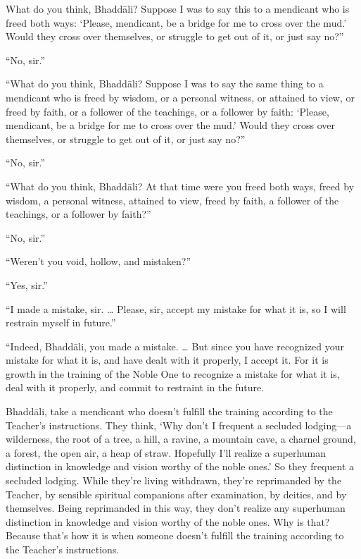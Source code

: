 \documentclass[12pt,openany]{book}%
\begin{document}
What do you think, \textsanskrit{Bhaddāli}? Suppose I was to say this to a mendicant who is freed both ways: ‘Please, mendicant, be a bridge for me to cross over the mud.’ Would they cross over themselves, or struggle to get out of it, or just say no?” 

“No, sir.” 

“What do you think, \textsanskrit{Bhaddāli}? Suppose I was to say the same thing to a mendicant who is freed by wisdom, or a personal witness, or attained to view, or freed by faith, or a follower of the teachings, or a follower by faith: ‘Please, mendicant, be a bridge for me to cross over the mud.’ Would they cross over themselves, or struggle to get out of it, or just say no?” 

“No, sir.” 

“What do you think, \textsanskrit{Bhaddāli}? At that time were you freed both ways, freed by wisdom, a personal witness, attained to view, freed by faith, a follower of the teachings, or a follower by faith?” 

“No, sir.” 

“Weren’t you void, hollow, and mistaken?” 

“Yes, sir.” 

“I made a mistake, sir. … Please, sir, accept my mistake for what it is, so I will restrain myself in future.” 

“Indeed, \textsanskrit{Bhaddāli}, you made a mistake. … But since you have recognized your mistake for what it is, and have dealt with it properly, I accept it. For it is growth in the training of the Noble One to recognize a mistake for what it is, deal with it properly, and commit to restraint in the future. 

\textsanskrit{Bhaddāli}, take a mendicant who doesn’t fulfill the training according to the Teacher’s instructions. They think, ‘Why don’t I frequent a secluded lodging—a wilderness, the root of a tree, a hill, a ravine, a mountain cave, a charnel ground, a forest, the open air, a heap of straw. Hopefully I’ll realize a superhuman distinction in knowledge and vision worthy of the noble ones.’ So they frequent a secluded lodging. While they’re living withdrawn, they’re reprimanded by the Teacher, by sensible spiritual companions after examination, by deities, and by themselves. Being reprimanded in this way, they don’t realize any superhuman distinction in knowledge and vision worthy of the noble ones. Why is that? Because that’s how it is when someone doesn’t fulfill the training according to the Teacher’s instructions. 
\end{document}
